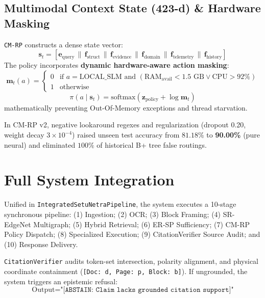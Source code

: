 \documentclass[conference]{IEEEtran}
\begin{document}
\subsection{Multimodal Context State (423-d) \& Hardware Masking}
\texttt{CM-RP} constructs a dense state vector:
\begin{equation}
\mathbf{s}_t = \left[ \mathbf{e}_{\text{query}} \,\|\, \mathbf{f}_{\text{struct}} \,\|\, \mathbf{f}_{\text{evidence}} \,\|\, \mathbf{f}_{\text{domain}} \,\|\, \mathbf{f}_{\text{telemetry}} \,\|\, \mathbf{f}_{\text{history}} \right]
\end{equation}
The policy incorporates \textbf{dynamic hardware-aware action masking}:
\begin{equation}
\mathbf{m}_t(a) = \begin{cases} 0 & \text{if } a = \text{LOCAL\_SLM} \text{ and } (\text{RAM}_{\text{avail}} < 1.5\text{ GB} \lor \text{CPU} > 92\%) \\ 1 & \text{otherwise} \end{cases}
\end{equation}
$$\pi(a \mid \mathbf{s}_t) = \text{softmax}(\mathbf{z}_{\text{policy}} + \log \mathbf{m}_t)$$
mathematically preventing Out-Of-Memory exceptions and thread starvation.

In CM-RP v2, negative lookaround regexes and regularization (dropout 0.20, weight decay $3 \times 10^{-4}$) raised unseen test accuracy from $81.18\%$ to \textbf{90.00\%} (pure neural) and eliminated $100\%$ of historical B+ tree false routings.

\section{Full System Integration}
Unified in \texttt{IntegratedSetuNetraPipeline}, the system executes a 10-stage synchronous pipeline: (1) Ingestion; (2) OCR; (3) Block Framing; (4) SR-EdgeNet Multigraph; (5) Hybrid Retrieval; (6) ER-SP Sufficiency; (7) CM-RP Policy Dispatch; (8) Specialized Execution; (9) CitationVerifier Source Audit; and (10) Response Delivery. 

\texttt{CitationVerifier} audits token-set intersection, polarity alignment, and physical coordinate containment (\texttt{[Doc: d, Page: p, Block: b]}). If ungrounded, the system triggers an epistemic refusal:
\begin{equation}
\text{Output} = \texttt{"[ABSTAIN: Claim lacks grounded citation support]"}
\end{equation}
\end{document}

